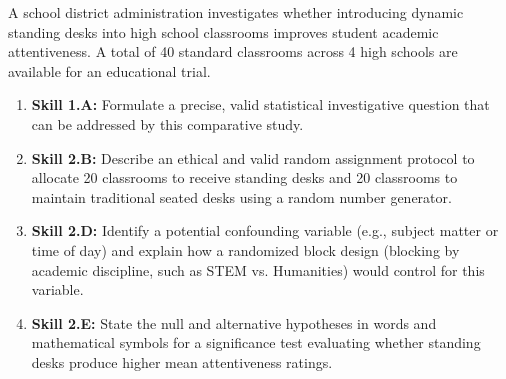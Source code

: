 \begin{workbookbox}
A school district administration investigates whether introducing dynamic standing desks into high school classrooms improves student academic attentiveness. A total of 40 standard classrooms across 4 high schools are available for an educational trial.
\begin{enumerate}[label=(\alph*)]
  \item \textbf{Skill 1.A:} Formulate a precise, valid statistical investigative question that can be addressed by this comparative study.
  \item \textbf{Skill 2.B:} Describe an ethical and valid random assignment protocol to allocate 20 classrooms to receive standing desks and 20 classrooms to maintain traditional seated desks using a random number generator.
  \item \textbf{Skill 2.D:} Identify a potential confounding variable (e.g., subject matter or time of day) and explain how a randomized block design (blocking by academic discipline, such as STEM vs. Humanities) would control for this variable.
  \item \textbf{Skill 2.E:} State the null and alternative hypotheses in words and mathematical symbols for a significance test evaluating whether standing desks produce higher mean attentiveness ratings.
\end{enumerate}
\end{workbookbox}

